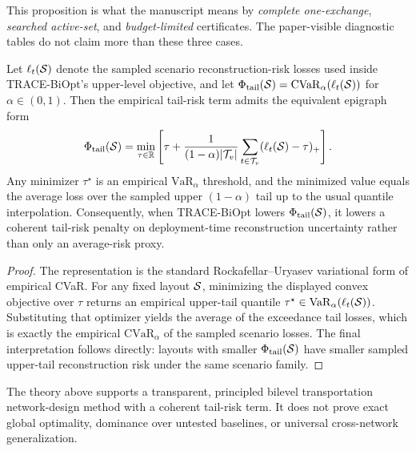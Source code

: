 This proposition is what the manuscript means by \emph{complete one-exchange},
\emph{searched active-set}, and \emph{budget-limited} certificates. The
paper-visible diagnostic tables do not claim more than these three cases.

\begin{proposition}
\label{prop:cvar-epigraph}
Let $\ell_t(\mathcal{S})$ denote the sampled scenario reconstruction-risk losses used
inside TRACE-BiOpt's upper-level objective, and let
$\Phi_{\mathrm{tail}}(\mathcal{S})=\mathrm{CVaR}_{\alpha}(\ell_t(\mathcal{S}))$ for
$\alpha\in(0,1)$. Then the empirical tail-risk term admits the equivalent
epigraph form
\[
    \Phi_{\mathrm{tail}}(\mathcal{S})
    =
    \min_{\tau\in\mathbb{R}}
    \left[
        \tau
        +
        \frac{1}{(1-\alpha)|\mathcal{T}_v|}
        \sum_{t\in\mathcal{T}_v}
        (\ell_t(\mathcal{S})-\tau)_+
    \right].
\]
Any minimizer $\tau^\star$ is an empirical $\mathrm{VaR}_{\alpha}$ threshold,
and the minimized value equals the average loss over the sampled upper
$(1-\alpha)$ tail up to the usual quantile interpolation. Consequently, when
TRACE-BiOpt lowers $\Phi_{\mathrm{tail}}(\mathcal{S})$, it lowers a coherent
tail-risk penalty on deployment-time reconstruction uncertainty rather than
only an average-risk proxy.
\end{proposition}

\begin{proof}
The representation is the standard Rockafellar--Uryasev variational form of
empirical CVaR. For any fixed layout $\mathcal{S}$, minimizing the displayed convex
objective over $\tau$ returns an empirical upper-tail quantile
$\tau^\star\in\mathrm{VaR}_{\alpha}(\ell_t(\mathcal{S}))$. Substituting that
optimizer yields the average of the exceedance tail losses, which is exactly
the empirical $\mathrm{CVaR}_{\alpha}$ of the sampled scenario losses. The
final interpretation follows directly: layouts with smaller
$\Phi_{\mathrm{tail}}(\mathcal{S})$ have smaller sampled upper-tail reconstruction
risk under the same scenario family.
\end{proof}

\begin{remark}
The theory above supports a transparent, principled bilevel transportation
network-design method with a coherent tail-risk term. It does not prove exact global optimality, dominance over untested baselines, or universal cross-network generalization.
\end{remark}

